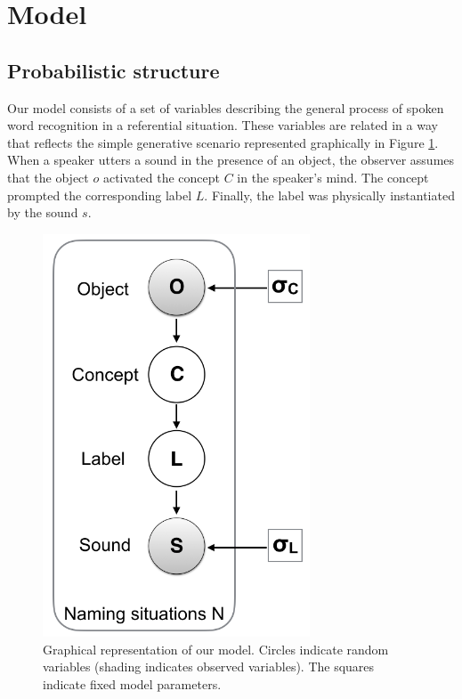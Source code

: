 \documentclass[english,,man,floatsintext]{apa6}
\theoremstyle{definition}
\theoremstyle{definition}
\theoremstyle{definition}
\theoremstyle{remark}
\begin{document}
\section{Model}\label{model}

\subsection{Probabilistic structure}\label{probabilistic-structure}

Our model consists of a set of variables describing the general process
of spoken word recognition in a referential situation. These variables
are related in a way that reflects the simple generative scenario
represented graphically in Figure \ref{fig:model}. When a speaker utters
a sound in the presence of an object, the observer assumes that the
object \(o\) activated the concept \(C\) in the speaker's mind. The
concept prompted the corresponding label \(L\). Finally, the label was
physically instantiated by the sound \(s\).

\begin{figure}

{\centering \includegraphics[width=300px]{figs/model} 

}

\caption{Graphical representation of our model. Circles indicate random variables (shading indicates observed variables). The squares indicate fixed model parameters.}\label{fig:model}
\end{figure}
\end{document}
